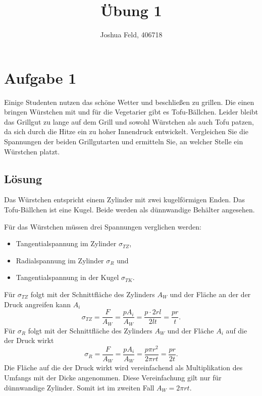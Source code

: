 \documentclass{exercise}
\institute{Lehr- und Forschungsgebiet Kontinuumsmechanik}
\title{Übung 1}
\author{Joshua Feld, 406718}
\begin{document}
    \maketitle


    \section*{Aufgabe 1}

    \begin{problem}
        Einige Studenten nutzen das schöne Wetter und beschließen zu grillen.
        Die einen bringen Würstchen mit und für die Vegetarier gibt es Tofu-Bällchen.
        Leider bleibt das Grillgut zu lange auf dem Grill und sowohl Würstchen als auch Tofu patzen, da sich durch die Hitze ein zu hoher Innendruck entwickelt.
        Vergleichen Sie die Spannungen der beiden Grillgutarten und ermitteln Sie, an welcher Stelle ein Würstchen platzt.
    \end{problem}

    \subsection*{Lösung}
    Das Würstchen entspricht einem Zylinder mit zwei kugelförmigen Enden.
    Das Tofu-Bällchen ist eine Kugel.
    Beide werden als dünnwandige Behälter angesehen.

    Für das Würstchen müssen drei Spannungen verglichen werden:
    \begin{itemize}
        \item Tangentialspannung im Zylinder \(\sigma_{TZ}\),
        \item Radialspannung im Zylinder \(\sigma_R\) und
        \item Tangentialspannung in der Kugel \(\sigma_{TK}\).
    \end{itemize}
    Für \(\sigma_{TZ}\) folgt mit der Schnittfläche des Zylinders \(A_W\) und der Fläche an der der Druck angreifen kann \(A_i\)
    \[
        \sigma_{TZ} = \frac{F}{A_W} = \frac{pA_i}{A_W} = \frac{p \cdot 2rl}{2lt} = \frac{pr}{t}.
    \]
    Für \(\sigma_R\) folgt mit der Schnittfläche des Zylinders \(A_W\) und der Fläche \(A_i\) auf die der Druck wirkt
    \[
        \sigma_R = \frac{F}{A_W} = \frac{pA_i}{A_W} = \frac{p\pi r^2}{2\pi rt} = \frac{pr}{2t}.
    \]
    Die Fläche auf die der Druck wirkt wird vereinfachend als Multiplikation des Umfangs mit der Dicke angenommen.
    Diese Vereinfachung gilt nur für dünnwandige Zylinder.
    Somit ist im zweiten Fall \(A_W = 2\pi rt\).
\end{document}
